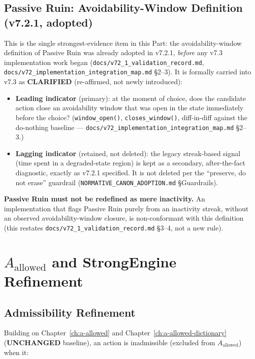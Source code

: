 \section{Passive Ruin: Avoidability-Window Definition (v7.2.1, adopted)}
\label{sec:v73-passive-ruin-window}

This is the single strongest-evidence item in this Part: the
avoidability-window definition of Passive Ruin was already adopted in
v7.2.1, \emph{before} any v7.3 implementation work began
(\texttt{docs/v72\_1\_validation\_record.md},
\texttt{docs/v72\_implementation\_integration\_map.md} \S2--3). It is
formally carried into v7.3 as \textbf{CLARIFIED} (re-affirmed, not
newly introduced):

\begin{itemize}
\item \textbf{Leading indicator} (primary): at the moment of choice,
does the candidate action close an avoidability window that was open
in the state immediately before the choice? (\texttt{window\_open()},
\texttt{closes\_window()}, diff-in-diff against the do-nothing
baseline --- \texttt{docs/v72\_implementation\_integration\_map.md}
\S2--3.)
\item \textbf{Lagging indicator} (retained, not deleted): the legacy
streak-based signal (time spent in a degraded-state region) is kept
as a secondary, after-the-fact diagnostic, exactly as
v7.2.1 specified. It is not deleted per the ``preserve, do not erase''
guardrail (\texttt{NORMATIVE\_CANON\_ADOPTION.md} \S Guardrails).
\end{itemize}

\noindent
\textbf{Passive Ruin must not be redefined as mere inactivity.} An
implementation that flags Passive Ruin purely from an inactivity
streak, without an observed avoidability-window closure, is
non-conformant with this definition (this restates
\texttt{docs/v72\_1\_validation\_record.md} \S3--4, not a new rule).

\chapter{$A_{\mathrm{allowed}}$ and StrongEngine Refinement}
\label{ch:v73-aallowed-strongengine}

\section{Admissibility Refinement}
\label{sec:v73-a-allowed-refinement}

Building on Chapter~\ref{ch:a-allowed} and
Chapter~\ref{ch:a-allowed-dictionary} (\textbf{UNCHANGED} baseline), an
action is inadmissible (excluded from $A_{\mathrm{allowed}}$) when it:

